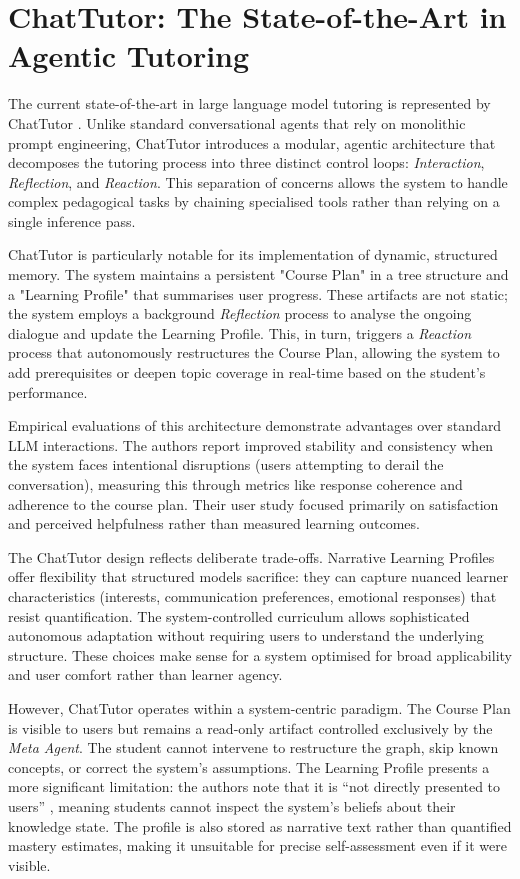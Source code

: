 \documentclass[logo,bsc,singlespacing,parskip,online]{infthesis}
\begin{document}
\section{ChatTutor: The State-of-the-Art in Agentic Tutoring}

The current state-of-the-art in large language model tutoring is represented by ChatTutor \citep{chen2024chattutor}. Unlike standard conversational agents that rely on monolithic prompt engineering, ChatTutor introduces a modular, agentic architecture that decomposes the tutoring process into three distinct control loops: \textit{Interaction}, \textit{Reflection}, and \textit{Reaction}. This separation of concerns allows the system to handle complex pedagogical tasks by chaining specialised tools rather than relying on a single inference pass.

ChatTutor is particularly notable for its implementation of dynamic, structured memory. The system maintains a persistent "Course Plan" in a tree structure and a "Learning Profile" that summarises user progress. These artifacts are not static; the system employs a background \textit{Reflection} process to analyse the ongoing dialogue and update the Learning Profile. This, in turn, triggers a \textit{Reaction} process that autonomously restructures the Course Plan, allowing the system to add prerequisites or deepen topic coverage in real-time based on the student's performance.

Empirical evaluations of this architecture demonstrate advantages over standard LLM interactions. The authors report improved stability and consistency when the system faces intentional disruptions (users attempting to derail the conversation), measuring this through metrics like response coherence and adherence to the course plan. Their user study focused primarily on satisfaction and perceived helpfulness rather than measured learning outcomes.

The ChatTutor design reflects deliberate trade-offs. Narrative Learning Profiles offer flexibility that structured models sacrifice: they can capture nuanced learner characteristics (interests, communication preferences, emotional responses) that resist quantification. The system-controlled curriculum allows sophisticated autonomous adaptation without requiring users to understand the underlying structure. These choices make sense for a system optimised for broad applicability and user comfort rather than learner agency.

However, ChatTutor operates within a system-centric paradigm. The Course Plan is visible to users but remains a read-only artifact controlled exclusively by the \textit{Meta Agent}. The student cannot intervene to restructure the graph, skip known concepts, or correct the system's assumptions. The Learning Profile presents a more significant limitation: the authors note that it is ``not directly presented to users'' \citep{chen2024chattutor}, meaning students cannot inspect the system's beliefs about their knowledge state. The profile is also stored as narrative text rather than quantified mastery estimates, making it unsuitable for precise self-assessment even if it were visible.
\end{document}
